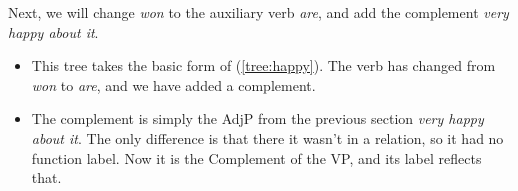 \ea {}\label{tree:wewon}
\z

Next, we will change \textit{won} to the auxiliary verb \textit{are}, and add the complement \textit{very happy about it}.
\begin{itemize}[noitemsep]
    \item This tree takes the basic form of (\ref{tree:happy}). The verb has changed from \textit{won} to \textit{are}, and we have added a complement.
    \item The complement is simply the AdjP from the previous section \textit{very happy about it}. The only difference is that there it wasn't in a relation, so it had no function label. Now it is the Complement of the VP, and its label reflects that.
\end{itemize}

\ea {}\label{tree:weareveryhappyaboutit}
\z

